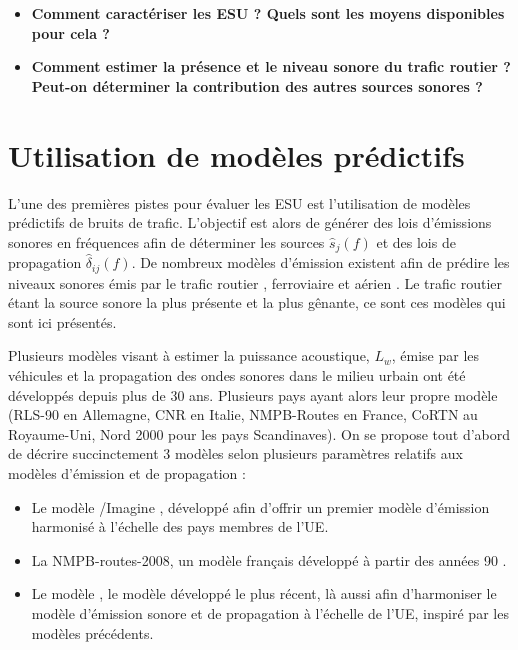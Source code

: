 \begin{itemize}
\item \textbf{Comment caractériser les ESU ? Quels sont les moyens disponibles pour cela ?}
\item \textbf{Comment estimer la présence et le niveau sonore du trafic routier ? Peut-on déterminer la contribution des autres sources sonores ?}\\
\end{itemize}

\section{Utilisation de modèles prédictifs}

L'une des premières pistes pour évaluer les ESU est l'utilisation de modèles prédictifs de bruits de trafic. L'objectif est alors de générer des lois d'émissions sonores en fréquences afin de déterminer les sources $\hat{s}_j(f)$ et des lois de propagation $\hat{\delta}_{ij}(f)$. De nombreux modèles d'émission existent afin de prédire les niveaux sonores émis par le trafic routier \cite{quartieri2009review}, ferroviaire \cite{van2000railway} et aérien \cite{zaporozhets1998aircraft}. Le trafic routier étant la source sonore la plus présente et la plus gênante, ce sont ces modèles qui sont ici présentés.

Plusieurs modèles visant à estimer la puissance acoustique, $L_w$, émise par les véhicules et la propagation des ondes sonores dans le milieu urbain ont été développés depuis plus de 30 ans. Plusieurs pays ayant alors leur propre modèle (RLS-90 en Allemagne, CNR en Italie, NMPB-Routes en France, CoRTN au Royaume-Uni, Nord 2000 pour les pays Scandinaves). On se propose tout d'abord de décrire succinctement 3 modèles selon plusieurs paramètres relatifs aux modèles d'émission et de propagation :

\begin{itemize}
\item Le modèle /Imagine \cite{jonasson2004source}, développé afin d'offrir un premier modèle d'émission harmonisé à l'échelle des pays membres de l'UE.
\item La NMPB-routes-2008, un modèle français développé à partir des années 90 \cite{setra_prevision_2009-1, setra_prevision_2009-2}.
\item Le modèle   \cite{CNOSSOS}, le modèle développé le plus récent, là aussi afin d'harmoniser le modèle d'émission sonore et de propagation à l'échelle de l'UE, inspiré par les modèles précédents.
\end{itemize}

